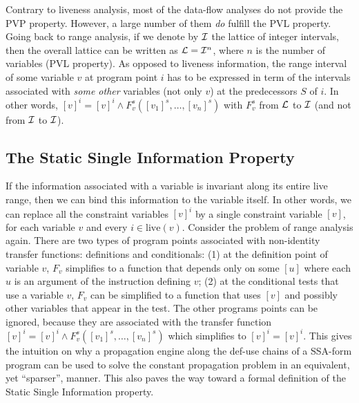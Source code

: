 Contrary to liveness analysis, most of the data-flow analyses do not provide the PVP property.
However, a large number of them \emph{do} fulfill the PVL property.
Going back to range analysis, if we denote by $\cal I$ the lattice of integer intervals, then the overall lattice can be written as ${\cal L}={\cal I}^n$, where $n$ is the number of variables (PVL property).
As opposed to liveness information, the range interval of some variable $v$ at program point $i$ has to be expressed in term of the intervals associated with \emph{some other} variables (not only $v$) at the predecessors $S$ of $i$.
In other words,  $[v]^i = [v]^i \wedge  F_v^s([v_1]^s,\dots,[v_n]^s)$ with $F_v^s$ from $\cal L$ to $\cal I$ (and not from $\cal I$ to $\cal I$).



\subsection{The Static Single Information Property}
\label{sec:ssi:pereira:singProp}

If the information associated with a variable is invariant along its
entire live range, then we can bind this information to the variable itself.
In other words, we can replace all the constraint variables
$[v]^i$ by a single constraint variable $[v]$, for each variable $v$
and every $i\in \textrm{live}(v)$. 
Consider the problem of range analysis again. There are two types of program points associated with non-identity transfer functions: definitions and conditionals:
(1) at the definition point of variable $v$, $F_v$ simplifies to a function that depends only on some $[u]$ where each $u$ is an argument of the instruction defining $v$;
(2) at the conditional tests that use a variable $v$, $F_v$ can be simplified to a function that uses $[v]$ and possibly other variables that appear in the test.
The other programs points can be ignored, because they are associated with the transfer function  $[v]^i = [v]^i \wedge F_v^s([v_1]^s, \dots, [v_n]^s)$ which simplifies to  $[v]^i = [v]^i$. 
This gives the intuition on why a propagation engine along the def-use chains of a SSA-form program can be used to solve the constant propagation problem in an equivalent, yet ``sparser'', manner.
This also paves the way toward a formal definition of the Static Single Information property.


